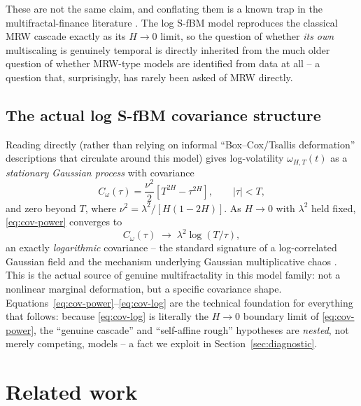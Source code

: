 \documentclass[11pt]{article}
\begin{document}
These are not the same claim, and conflating them is a known trap in the multifractal-finance literature \citep{rak2018quantitative}. The log S-fBM model reproduces the classical MRW cascade exactly as its $H\to0$ limit, so the question of whether \emph{its own} multiscaling is genuinely temporal is directly inherited from the much older question of whether MRW-type models are identified from data at all -- a question that, surprisingly, has rarely been asked of MRW directly.

\subsection{The actual log S-fBM covariance structure}

Reading \citet{wu2022rough} directly (rather than relying on informal ``Box--Cox/Tsallis deformation'' descriptions that circulate around this model) gives log-volatility $\omega_{H,T}(t)$ as a \emph{stationary Gaussian process} with covariance
\begin{equation}
C_\omega(\tau) = \frac{\nu^2}{2}\left[T^{2H} - \tau^{2H}\right], \qquad |\tau|<T, \label{eq:cov-power}
\end{equation}
and zero beyond $T$, where $\nu^2 = \lambda^2/[H(1-2H)]$. As $H\to0$ with $\lambda^2$ held fixed, \eqref{eq:cov-power} converges to
\begin{equation}
C_\omega(\tau) \;\longrightarrow\; \lambda^2 \log(T/\tau), \label{eq:cov-log}
\end{equation}
an exactly \emph{logarithmic} covariance -- the standard signature of a log-correlated Gaussian field and the mechanism underlying Gaussian multiplicative chaos \citep{kahane1985chaos, rhodes2014gaussian}. This is the actual source of genuine multifractality in this model family: not a nonlinear marginal deformation, but a specific covariance shape. Equations~\eqref{eq:cov-power}--\eqref{eq:cov-log} are the technical foundation for everything that follows: because \eqref{eq:cov-log} is literally the $H\to0$ boundary limit of \eqref{eq:cov-power}, the ``genuine cascade'' and ``self-affine rough'' hypotheses are \emph{nested}, not merely competing, models -- a fact we exploit in Section~\ref{sec:diagnostic}.

\section{Related work}
\end{document}
